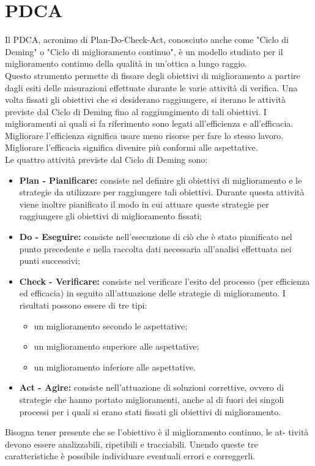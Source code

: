 \documentclass[PianoDiQualifica.tex]{subfiles}
\begin{document}
\section{PDCA}
Il PDCA, acronimo di Plan-Do-Check-Act, conosciuto anche come "Ciclo di
Deming" o "Ciclo di miglioramento continuo", è un modello studiato per il
miglioramento continuo della qualità in un’ottica a lungo raggio.\\ 
Questo strumento permette di fissare degli obiettivi di miglioramento a partire dagli esiti delle misurazioni effettuate durante le varie attività di verifica.
Una volta fissati gli obiettivi che si desiderano raggiungere, si iterano le attività previste dal Ciclo di Deming fino al raggiungimento di tali obiettivi.
I miglioramenti ai quali si fa riferimento sono legati all’efficienza e all’efficacia. Migliorare l’efficienza significa usare meno risorse per fare lo stesso
lavoro. Migliorare l’efficacia significa divenire più conformi alle aspettative.\\
Le quattro attività previste dal Ciclo di Deming sono:
\begin{itemize}
\item \textbf{Plan - Pianificare:} consiste nel definire gli obiettivi di miglioramento
e le strategie da utilizzare per raggiungere tali obiettivi. Durante questa
attività viene inoltre pianificato il modo in cui attuare queste strategie
per raggiungere gli obiettivi di miglioramento fissati;
\item \textbf{Do - Eseguire:} consiste nell'esecuzione di ciò che è stato pianificato nel punto precedente e nella raccolta dati necessaria all'analisi effettuata nei punti successivi;
\item \textbf{ Check - Verificare:} consiste nel verificare l’esito del processo (per
efficienza ed efficacia) in seguito all’attuazione delle strategie di miglioramento. I risultati possono essere di tre tipi:
\begin{itemize}
\item un miglioramento secondo le aspettative;
\item un miglioramento superiore alle aspettative;
\item un miglioramento inferiore alle aspettative.
\end{itemize}
\item \textbf{ Act - Agire:} consiste nell’attuazione di soluzioni correttive, ovvero di strategie che hanno portato miglioramenti, anche al di fuori dei singoli processi per i quali si erano stati fissati gli obiettivi di miglioramento.
\end{itemize}

Bisogna tener presente che se l’obiettivo è il miglioramento continuo, le at-
tività devono essere analizzabili, ripetibili e tracciabili. Unendo queste tre
caratteristiche è possibile individuare eventuali errori e correggerli.
\end{document}
